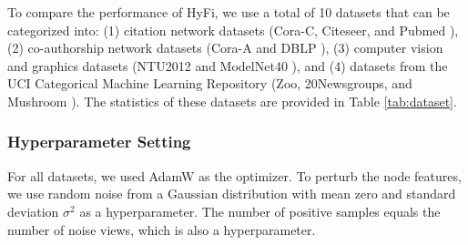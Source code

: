 To compare the performance of HyFi, we use a total of 10 datasets that can be categorized into: (1) citation network datasets (Cora-C, Citeseer, and Pubmed \cite{sen2008collective}), (2) co-authorship network datasets (Cora-A and DBLP \cite{rossi2015network}), (3) computer vision and graphics datasets (NTU2012 \cite{chen2003visual} and ModelNet40 \cite{wu20153d}), and (4) datasets from the UCI Categorical Machine Learning Repository (Zoo, 20Newsgroups, and Mushroom \cite{asuncion2007ucireferences}). The statistics of these datasets are provided in Table \ref{tab:dataset}.

\subsubsection{Hyperparameter Setting}
For all datasets, we used AdamW as the optimizer\cite{loshchilov2018decoupled}. To perturb the node features, we use random noise from a Gaussian distribution with mean zero and standard deviation $\sigma^2$ as a hyperparameter. The number of positive samples equals the number of noise views, which is also a hyperparameter.


